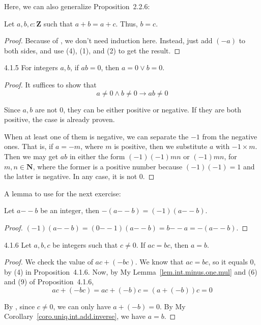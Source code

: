 Here, we can also generalize Proposition~2.2.6:
\begin{prop}\label{prop.int.add.cancel}
Let $a,b,c : \mathbf{Z}$ such that $a+b=a+c$. Thus, $b=c$.
\end{prop}
\begin{proof}
	Because of , we don't need induction here. Instead, just
	add $(-a)$ to both sides, and use (4), (1), and (2) to get the result.
\end{proof}

\begin{exercise}{4.1.5}
For integers $a,b$, if $ab=0$, then $a=0 \lor b=0$.
\end{exercise}
\begin{proof}
It suffices to show that
\[
a \neq 0 \wedge b \neq 0 \rightarrow ab \neq 0
\]

Since $a,b$ are not 0, they can be either positive or negative. If they are both
positive, the case is already proven.

When at least one of them is negative, we can separate the $-1$ from the
negative ones. That is, if $a=-m$, where $m$ is positive, then we substitute $a$
with $-1 \times m$. Then we may get $ab$ in either the form $(-1)(-1) mn$ or
$(-1) mn$, for $m,n \in \mathbf{N}$, where the former is a positive number
because $(-1)(-1) =1$ and the latter is negative. In any case, it is not $0$.
\end{proof}

A lemma to use for the next exercise:
\begin{lem}\label{lem.int.minus.one.mul}
	Let $a{--}b$ be an integer, then $-(a{--}b) = (-1)(a{--}b)$.
\end{lem}
\begin{proof}
	$(-1)(a{--}b) = (0{--}1)(a{--}b) = b{--}a = -(a{--}b)$.
\end{proof}

\begin{exercise}{4.1.6}
Let $a,b,c$ be integers such that $c\ne 0$. If $ac=bc$, then $a = b$.
\end{exercise}
\begin{proof}
We check the value of $ac+(-bc)$. We know that $ac=bc$, so it equals 0, by (4)
in Proposition~4.1.6. Now, by My Lemma~\ref{lem.int.minus.one.mul} and (6) and
(9) of Proposition~4.1.6,
\[
ac + (-bc) = ac+(-b)c = (a+(-b))c = 0
\]

By , since $c\ne 0$, we can only have $a+(-b) = 0$. By My
Corollary~\ref{coro.uniq.int.add.inverse}, we have $a=b$.
\end{proof}

